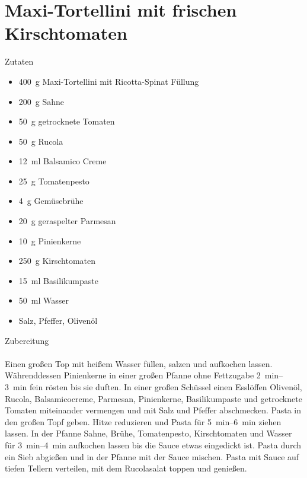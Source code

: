 \section*{Maxi-Tortellini mit frischen Kirschtomaten}
\ihead{}\ohead{}
\cfoot{}
{\Large Zutaten}
\begin{multicols}{2}
\begin{itemize}
    \item \SI{400}{g} Maxi-Tortellini mit Ricotta-Spinat Füllung
    \item \SI{200}{g} Sahne
    \item \SI{50}{g} getrocknete Tomaten
    \item \SI{50}{g} Rucola
    \item \SI{12}{ml} Balsamico Creme
    \item \SI{25}{g} Tomatenpesto
    \item \SI{4}{g} Gemüsebrühe
    \item \SI{20}{g} geraspelter Parmesan
    \item \SI{10}{g} Pinienkerne
    \item \SI{250}{g} Kirschtomaten
    \item \SI{15}{ml} Basilikumpaste
    \item \SI{50}{ml} Wasser
    \item Salz, Pfeffer, Olivenöl
\end{itemize}
\end{multicols}
\noindent
{\Large Zubereitung}\\
\\
Einen großen Top mit heißem Wasser füllen, salzen und aufkochen lassen. 
Währenddessen Pinienkerne in einer großen Pfanne ohne Fettzugabe \SIrange{2}{3}{min} fein rösten bis sie duften.
In einer großen Schüssel einen Esslöffen Olivenöl, Rucola, Balsamicocreme, Parmesan, Pinienkerne, Basilikumpaste und getrocknete Tomaten miteinander vermengen und mit Salz und Pfeffer abschmecken.
Pasta in den großen Topf geben.
Hitze reduzieren und Pasta für \SIrange{5}{6}{min} ziehen lassen.
In der Pfanne Sahne, Brühe, Tomatenpesto, Kirschtomaten und Wasser für \SIrange{3}{4}{min} aufkochen lassen bis die Sauce etwas eingedickt ist. 
Pasta durch ein Sieb abgießen und in der Pfanne mit der Sauce mischen. 
Pasta mit Sauce auf tiefen Tellern verteilen, mit dem Rucolasalat toppen und genießen.
